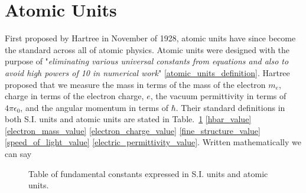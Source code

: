     \section{Atomic Units} \label{sec:atomic_units}    
        First proposed by Hartree in November of 1928, atomic units have since become the standard across all of atomic physics. Atomic units were designed with the purpose of "\textit{eliminating various universal constants from equations and also to avoid high powers of 10 in numerical work}" \ref{atomic_units_definition}. Hartree proposed that we measure the mass in terms of the mass of the electron $m_e$, charge in terms of the electron charge, $e$, the vacuum permittivity in terms of $4\pi \epsilon_0$, and the angular momentum in terms of $\hbar$. Their standard definitions in both S.I. units and atomic units are stated in Table.~\ref{tab:units} \ref{hbar_value}\ref{electron_mass_value} \ref{electron_charge_value} \ref{fine_structure_value} \ref{speed_of_light_value} \ref{electric_permittivity_value}. Written mathematically we can say

        \begin{figure}
            \centering 
            \label{tab:units}\caption{Table of fundamental constants expressed in S.I. units and atomic units.}
        \end{figure}
        
